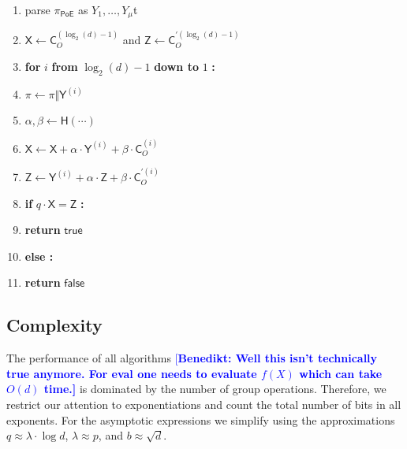 \documentclass{article}
\theoremstyle{definition}
\newcommand{\benedikt}[1]{{\textcolor{blue}{[\bf Benedikt: #1]}}}
\begin{document}
\begin{mdframed}
\begin{enumerate}[nolistsep]
	\item parse $\pi_{\mathsf{PoE}}$ as $Y_1,\dots,Y_\mu$t
	\item $\mathsf{X} \gets \mathsf{C}_O^{(\log_2(d)-1)}$ and $\mathsf{Z} \gets \mathsf{C}_O^{\prime(\log_2(d)-1)}$
	\item \textbf{for} $i$ \textbf{from} $\log_2(d) - 1$ \textbf{down to} $1$ \textbf{:}
	\item \pcind $\pi \gets \pi \Vert \mathsf{Y}^{(i)}$
	\item \pcind $\alpha, \beta \gets \mathsf{H}(\cdots)$
	\item \pcind $\mathsf{X} \gets \mathsf{X} + \alpha \cdot \mathsf{Y}^{(i)} + \beta \cdot \mathsf{C}_O^{(i)}$
	\item \pcind $\mathsf{Z} \gets \mathsf{Y}^{(i)} + \alpha \cdot \mathsf{Z} + \beta \cdot \mathsf{C}_O^{\prime(i)}$
	\item \textbf{if} $q \cdot \mathsf{X} = \mathsf{Z}$ \textbf{:}
	\item \pcind \textbf{return} $\mathsf{true}$
	\item \textbf{else :}
	\item \pcind \textbf{return} $\mathsf{false}$
\end{enumerate}
\end{mdframed}

\subsection{Complexity}

The performance of all algorithms \benedikt{Well this isn't technically true anymore. For eval one needs to evaluate $f(X)$ which can take $O(d)$ time.} is dominated by the number of group operations. Therefore, we restrict our attention to exponentiations and count the total number of bits in all exponents. For the asymptotic expressions we simplify using the approximations $q \approx \lambda \cdot \log d$, $\lambda \approx p$, and $b \approx \sqrt{d}$.
\end{document}

